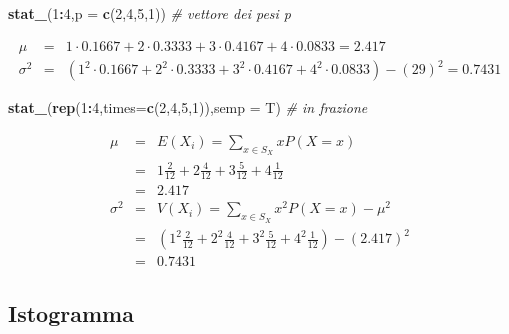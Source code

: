 \documentclass[
  11pt,
]{book}
\newenvironment{Shaded}{\begin{snugshade}}{\end{snugshade}}
\newcommand{\AttributeTok}[1]{\textcolor[rgb]{0.13,0.29,0.53}{#1}}
\newcommand{\CommentTok}[1]{\textcolor[rgb]{0.56,0.35,0.01}{\textit{#1}}}
\newcommand{\DecValTok}[1]{\textcolor[rgb]{0.00,0.00,0.81}{#1}}
\newcommand{\FunctionTok}[1]{\textcolor[rgb]{0.13,0.29,0.53}{\textbf{#1}}}
\newcommand{\NormalTok}[1]{#1}
\newcommand{\SpecialCharTok}[1]{\textcolor[rgb]{0.81,0.36,0.00}{\textbf{#1}}}
\theoremstyle{mytheoremstyle}
\theoremstyle{mydefstyle}
\begin{document}
\begin{Shaded}
\begin{Highlighting}[]
\FunctionTok{stat\_}\NormalTok{(}\DecValTok{1}\SpecialCharTok{:}\DecValTok{4}\NormalTok{,}\AttributeTok{p =} \FunctionTok{c}\NormalTok{(}\DecValTok{2}\NormalTok{,}\DecValTok{4}\NormalTok{,}\DecValTok{5}\NormalTok{,}\DecValTok{1}\NormalTok{))       }\CommentTok{\# vettore dei pesi p}
\end{Highlighting}
\end{Shaded}

\begin{eqnarray*}
 \mu &=&  1  \cdot 0.1667+ 2  \cdot 0.3333+ 3  \cdot 0.4167+ 4  \cdot 0.0833 = 2.417 \\ \sigma^2 &=&(  1 ^2 \cdot 0.1667+ 2 ^2 \cdot 0.3333+ 3 ^2 \cdot 0.4167+ 4 ^2 \cdot 0.0833 )-( 29 )^2= 0.7431 \end{eqnarray*}

\begin{Shaded}
\begin{Highlighting}[]
\FunctionTok{stat\_}\NormalTok{(}\FunctionTok{rep}\NormalTok{(}\DecValTok{1}\SpecialCharTok{:}\DecValTok{4}\NormalTok{,}\AttributeTok{times=}\FunctionTok{c}\NormalTok{(}\DecValTok{2}\NormalTok{,}\DecValTok{4}\NormalTok{,}\DecValTok{5}\NormalTok{,}\DecValTok{1}\NormalTok{)),}\AttributeTok{semp =}\NormalTok{ T) }\CommentTok{\# in frazione}
\end{Highlighting}
\end{Shaded}

\begin{eqnarray*} \mu &=& E(X_i) = \sum_{x\in S_X}x P(X=x)\\ 
 &=&  1  \frac { 2 }{ 12 }+ 2  \frac { 4 }{ 12 }+ 3  \frac { 5 }{ 12 }+ 4  \frac { 1 }{ 12 } \\ 
            &=& 2.417 \\ 
 \sigma^2 &=& V(X_i) = \sum_{x\in S_X}x^2 P(X=x)-\mu^2\\ 
 &=&\left(  1  ^2\frac { 2 }{ 12 }+ 2  ^2\frac { 4 }{ 12 }+ 3  ^2\frac { 5 }{ 12 }+ 4  ^2\frac { 1 }{ 12 } \right)-( 2.417 )^2\\ 
            &=& 0.7431 
\end{eqnarray*}

\subsection{Istogramma}\label{istogramma}
\end{document}
